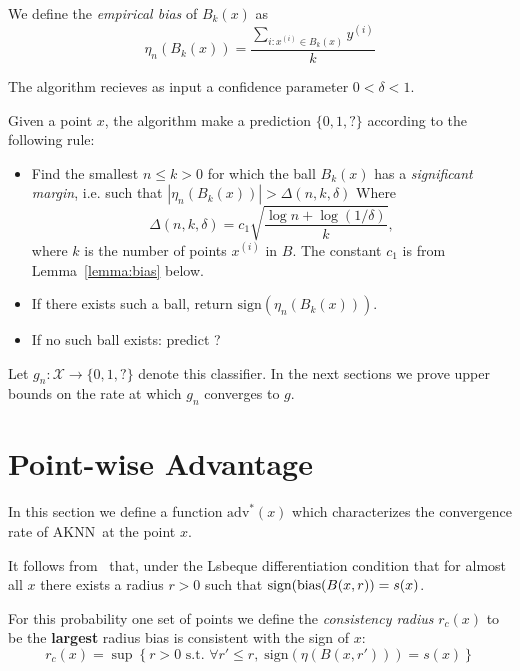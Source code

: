 \documentclass{article}
\def\X{{\mathcal X}}
\def\bias{{\rm bias}}
\newcommand{\sign}{\mbox{sign}}
\newcommand{\algname}{\textsc{AKNN}}
\newcommand{\comment}[3]{}  %
\newcommand{\shay}[1]{\comment{purple}{Shay}{#1}}
\newcommand{\yoav}[1]{\comment{green}{Yoav}{#1}}
\begin{document}
We define the {\em empirical bias} of $B_k(x)$ as
\begin{equation}
  \eta_n(B_k(x))
  = \frac{\sum_{i:x^{(i)} \in B_k(x)} y^{(i)}}{k}
\label{eq:empirical-bias}
\end{equation}

The algorithm recieves as input a confidence parameter $0 < \delta <1$.

Given a point $x$, the algorithm make a prediction $\{0,1,?\}$  according to the following rule:

\begin{itemize}
\item Find the smallest $n \leq k>0$ for which the ball $B_k(x)$ has a
  {\em significant margin}, i.e. such that $\left|\eta_n(B_k(x))\right| > \Delta(n,k,\delta)$
  Where
  $$ \Delta(n,k,\delta) = c_1 \sqrt{\frac{\log n + \log (1/\delta)}{k}}, $$
where $k$ is the number of points $x^{(i)}$ in $B$. The constant $c_1$ is from Lemma~\ref{lemma:bias} below.
\shay{I presume $d_0$ denotes the VC dimension of the family of all balls? 
$d_0$ should be set to $1$ in the case of the ``expected-case'' analysis}
\yoav{I suggest we push $d_0$ to the end of the paper}
\item If there exists such a ball, return $\sign(\eta_n(B_k(x)))$.
\item If no such ball exists: predict ?
\end{itemize}
Let $g_n: \X \rightarrow \{0,1,?\}$ denote this classifier.
In the next sections we prove upper bounds on the rate at which  $g_n$ converges to $g$.

\section{Point-wise Advantage}

\newcommand{\advantage}{\mbox{adv}}
\newcommand{\opt}{\mbox{adv}^*}
\newcommand{\eopt}{\epsilon \mbox{-Opt}}

In this section we define a  function $\opt(x)$ which
characterizes the convergence rate of \algname\ at the point $x$.

It follows from~\cite{ChaudhuriDasgupta2014} that, under the Lsbeque
differentiation condition that for almost all $x$ there exists a radius
$r>0$ such that $\sign(\bias(B(x,r))=s(x)$.

\newcommand{\rconsist}{r_c}

For this probability one set of points we 
define the {\em consistency radius} $\rconsist(x)$ to be the 
{\bf largest} radius  bias is consistent with the sign of $x$:
\begin{equation}
\rconsist(x) = \sup \left\{ r>0 \mbox{ s.t. } \forall r' \leq r, \;\sign(\eta(B(x,r')))
  =  s(x) \right\}
\end{equation}
\end{document}
